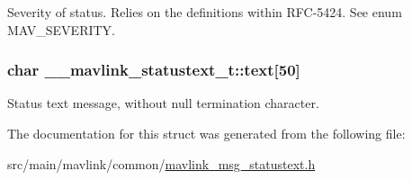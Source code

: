 Severity of status. Relies on the definitions within R\+F\+C-\/5424. See enum M\+A\+V\+\_\+\+S\+E\+V\+E\+R\+I\+T\+Y. 

\hypertarget{struct____mavlink__statustext__t_ad841b35268fabb3a101c2524da5a31be}{
\subsubsection[{text}]{\setlength{\rightskip}{0pt plus 5cm}char \+\_\+\+\_\+mavlink\+\_\+statustext\+\_\+t\+::text\mbox{[}50\mbox{]}}}\label{struct____mavlink__statustext__t_ad841b35268fabb3a101c2524da5a31be}


Status text message, without null termination character. 



The documentation for this struct was generated from the following file\+:\begin{DoxyCompactItemize}
\item 
src/main/mavlink/common/\hyperlink{mavlink__msg__statustext_8h}{mavlink\+\_\+msg\+\_\+statustext.\+h}\end{DoxyCompactItemize}
